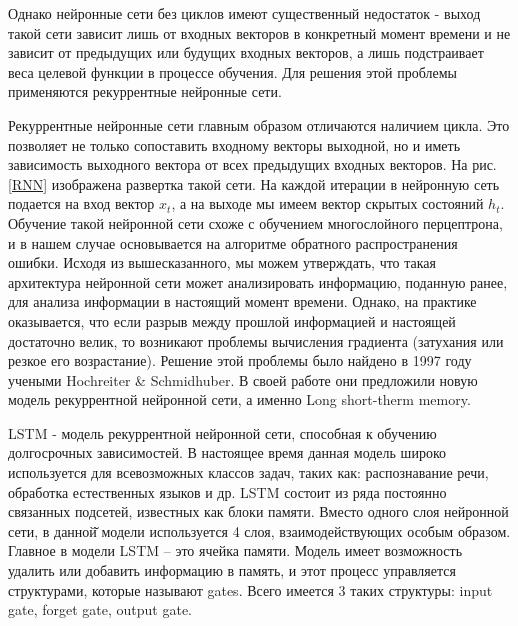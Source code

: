     Однако нейронные сети без циклов имеют существенный недостаток - выход такой сети зависит лишь от входных векторов в конкретный момент времени и не зависит от предыдущих или будущих входных векторов, а лишь подстраивает веса целевой функции в процессе обучения. Для решения этой проблемы применяются рекуррентные нейронные сети.

    Рекуррентные нейронные сети главным образом отличаются наличием цикла. Это позволяет не только сопоставить входному векторы выходной, но и иметь зависимость выходного вектора от всех предыдущих входных векторов. На рис. \ref{RNN} изображена развертка такой сети. На каждой итерации в нейронную сеть подается на вход вектор $x_{t}$, а на выходе мы имеем вектор скрытых состояний $h_{t}$.
    Обучение такой нейронной сети схоже с обучением многослойного перцептрона, и в нашем случае основывается на алгоритме обратного распространения ошибки. Исходя из вышесказанного, мы можем утверждать, что такая архитектура нейронной сети может анализировать информацию, поданную ранее, для анализа информации в настоящий момент времени. Однако, на практике оказывается, что если разрыв между прошлой информацией и настоящей достаточно велик, то возникают проблемы вычисления градиента (затухания или резкое его возрастание). Решение этой проблемы было найдено в 1997 году учеными Hochreiter \& Schmidhuber. В своей работе они предложили новую модель рекуррентной нейронной сети, а именно Long short-therm memory.

    LSTM - модель рекуррентной нейронной сети, способная к обучению долгосрочных зависимостей. В настоящее время данная модель широко используется для всевозможных классов задач, таких как: распознавание речи, обработка естественных языков и др. LSTM состоит из ряда постоянно связанных подсетей, известных как блоки памяти. Вместо одного слоя нейронной сети, в данной̆ модели используется 4 слоя, взаимодействующих особым образом. Главное в модели LSTM – это ячейка памяти. Модель имеет возможность удалить или добавить информацию в память, и этот процесс управляется структурами, которые называют gates. Всего имеется 3 таких структуры: input gate, forget gate, output gate.
    
